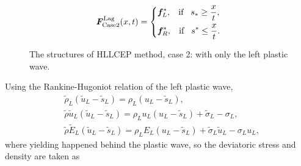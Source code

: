 \documentclass{article}
\theoremstyle{plain}\newtheorem{definition}{\sc{Definition}}
\theoremstyle{defination}\newtheorem{example}{Example}[section]
\numberwithin{equation}{section}
\numberwithin{table}{section}
\begin{document}
\begin{equation}
	\bm{F}^{\text{Lag}}_{\text{Case2}}(x,t) = \left\{ \begin{aligned}
		& \bm{f}_L^*, \hspace{0.3cm} \text{if} \hspace{0.3cm} s_*\ge \frac{x}{t},\\
		& \bm{f}_R^*, \hspace{0.3cm} \text{if} \hspace{0.3cm} s^*\le \frac{x}{t}.\\
	  \end{aligned}
	\right.
  \end{equation}


 \begin{figure}
   \centering 
{}
\caption{The  structures of HLLCEP method, case 2: with only  the left plastic wave.}
\label{fig:case2}
\end{figure}
 Using the Rankine-Hugoniot relation of  the left  plastic wave,
  \begin{align}
	&\widetilde{\rho}_L(\widetilde{u}_L-\widetilde{s}_L) = \rho_L(u_L-\widetilde{s}_L), \label{eq:RHp1}\\
	&\widetilde{\rho}\widetilde{u}_L(\widetilde{u}_L-\widetilde{s}_L) = \rho_Lu_L(u_L-\widetilde{s}_L)+\widetilde{\sigma}_L-\sigma_L,  \label{eq:RHp2}\\
	&\widetilde{\rho}\widetilde{E}_L(\widetilde{u}_L-\widetilde{s}_L) = \rho_LE_L(u_L-\widetilde{s}_L)+\widetilde{\sigma}_L \widetilde{u}_L-\sigma_Lu_L, \label{eq:RHp3}
\end{align}
where yielding happened behind the plastic wave, so the deviatoric stress and density are taken as  
\end{document}
